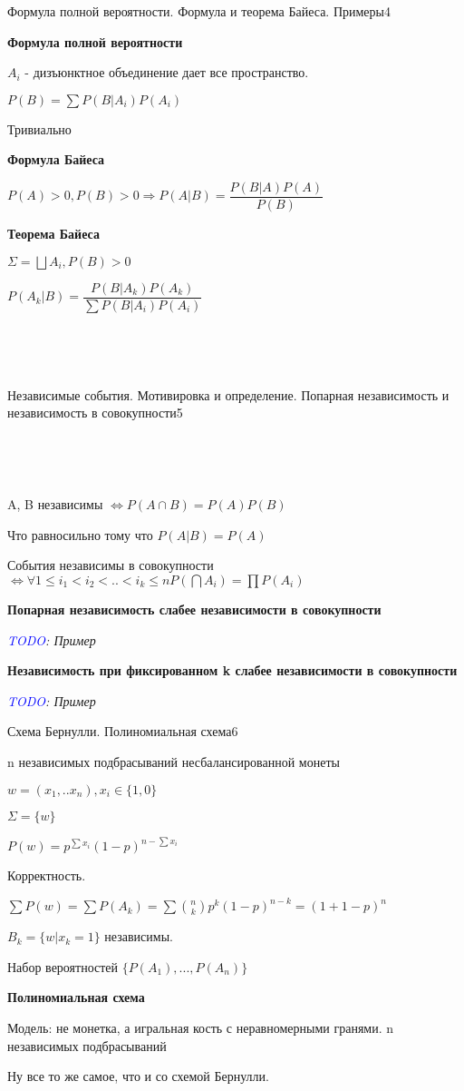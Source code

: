 \documentclass{article}
\begin{document}
\begin{question}{Формула полной вероятности. Формула и теорема Байеса. Примеры}{4}

\textbf{Формула полной вероятности}

$A_i $ - дизъюнктное объединение дает все пространство.

$P(B) = \sum{P(B | A_i) P(A_i)}$

Тривиально

\textbf{Формула Байеса}

$P(A) > 0, P(B) > 0 \Rightarrow P(A|B) = \dfrac{P(B|A)P(A)}{P(B)}$

\textbf{Теорема Байеса}

$\Sigma = \bigsqcup{A_i}, P(B) > 0$

$P(A_k | B) = \dfrac{P(B | A_k) P(A_k)}{\sum{P(B | A_i)P(A_i)}}$

\end{question}

~\

~\

\begin{question}{Независимые события. Мотивировка и определение. Попарная независимость и независимость в совокупности}{5}

~\

~\

A, B независимы $\Leftrightarrow P(A \cap B) = P(A) P(B)$

Что равносильно тому что $P(A | B) = P(A)$

События независимы в совокупности $\Leftrightarrow \forall 1 \leq i_1 < i_2 < .. < i_k \leq n P(\bigcap{A_i}) = \prod{P(A_i)}$

\textbf{Попарная независимость слабее независимости в совокупности}

\textit{\textcolor{blue}{TODO}: Пример}

\textbf{Независимость при фиксированном k слабее независимости в совокупности}

\textit{\textcolor{blue}{TODO}: Пример}

\end{question}

\begin{question}{Схема Бернулли. Полиномиальная схема}{6}

n независимых подбрасываний несбалансированной монеты

$w = (x_1, .. x_n), x_i \in \{1, 0\}$

$\Sigma = \{w\}$

$P(w) = p^{\sum{x_i}}(1 - p)^{n - \sum{x_i}}$

Корректность.

$\sum{P(w)} = \sum{P(A_k)} = \sum{{n \choose k}p^k(1 - p)^{n - k}} = (1 + 1 - p)^n$

$B_k = \{w | x_k = 1\}$ независимы.

Набор вероятностей $\{P(A_1), ..., P(A_n)\}$

\textbf{Полиномиальная схема}

Модель: не монетка, а игральная кость с неравномерными гранями. n независимых подбрасываний

Ну все то же самое, что и со схемой Бернулли. 


\end{question}
\end{document}
